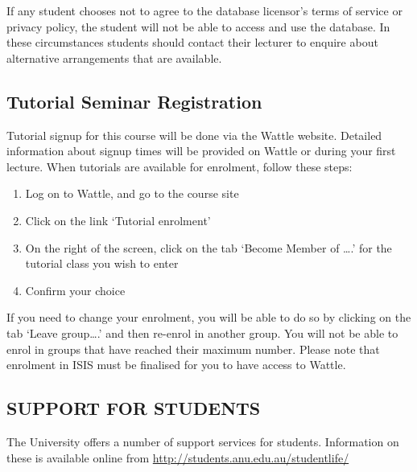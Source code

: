 \documentclass[11pt]{article}
\begin{document}
If any student chooses not to agree to the database licensor’s terms of service or privacy policy, the student will not be able to access and use the database. In these circumstances students should contact their lecturer to enquire about alternative arrangements that are available.

\subsection*{Tutorial Seminar Registration}
Tutorial signup for this course will be done via the Wattle website. Detailed information about signup times will be provided on Wattle or during your first lecture. When tutorials are available for enrolment, follow these steps:

\begin{enumerate}
	\item  Log on to Wattle, and go to the course site
	\item  Click on the link `Tutorial enrolment'
	\item  On the right of the screen, click on the tab `Become Member of \ldots.' for the tutorial class you wish to enter
	\item  Confirm your choice
\end{enumerate}

If you need to change your enrolment, you will be able to do so by clicking on the tab `Leave group\ldots.' and then re-enrol in another group. You will not be able to enrol in groups that have reached their maximum number. Please note that enrolment in ISIS must be finalised for you to have access to Wattle.

\subsection*{SUPPORT FOR STUDENTS}
The University offers a number of support services for students. Information on these is available online from \url{http://students.anu.edu.au/studentlife/}
\end{document}
